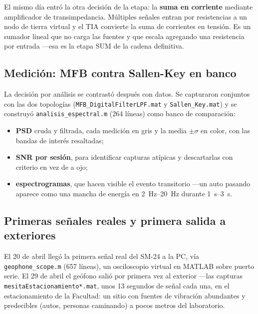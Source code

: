 El mismo d\'ia entr\'o la otra decisi\'on de la etapa: la \textbf{suma en
corriente} mediante amplificador de transimpedancia. M\'ultiples se\~nales
entran por resistencias a un nodo de tierra virtual y el TIA convierte la suma
de corrientes en tensi\'on. Es un sumador lineal que no carga las fuentes y que
escala agregando una resistencia por entrada ---esa es la etapa SUM de la
cadena definitiva.

\subsection{Medici\'on: MFB contra Sallen-Key en banco}

La decisi\'on por an\'alisis se contrast\'o despu\'es con datos. Se capturaron
conjuntos con las dos topolog\'ias (\texttt{MFB\_DigitalFilterLPF.mat} y
\texttt{Sallen\_Key.mat}) y se construy\'o \texttt{analisis\_espectral.m} (264
l\'ineas) como banco de comparaci\'on:

\begin{itemize}[itemsep=0.2em]
\item \textbf{PSD} cruda y filtrada, cada medici\'on en gris y la media
$\pm\sigma$ en color, con las bandas de inter\'es resaltadas;
\item \textbf{SNR por sesi\'on}, para identificar capturas at\'ipicas y
descartarlas con criterio en vez de a ojo;
\item \textbf{espectrogramas}, que hacen visible el evento transitorio ---un
auto pasando aparece como una mancha de energ\'ia en \SIrange{2}{20}{\hertz}
durante \SIrange{1}{3}{\second}.
\end{itemize}


\subsection{Primeras se\~nales reales y primera salida a exteriores}

El 20 de abril lleg\'o la primera se\~nal real del SM-24 a la PC, v\'ia
\texttt{geophone\_scope.m} (657 l\'ineas), un osciloscopio virtual en MATLAB
sobre puerto serie. El 29 de abril el ge\'ofono sali\'o por primera vez al
exterior ---las capturas \texttt{mesitaEstacionamiento*.mat}, unos 13 segundos
de se\~nal cada una, en el estacionamiento de la Facultad: un sitio con fuentes
de vibraci\'on abundantes y predecibles (autos, personas caminando) a pocos
metros del laboratorio.

